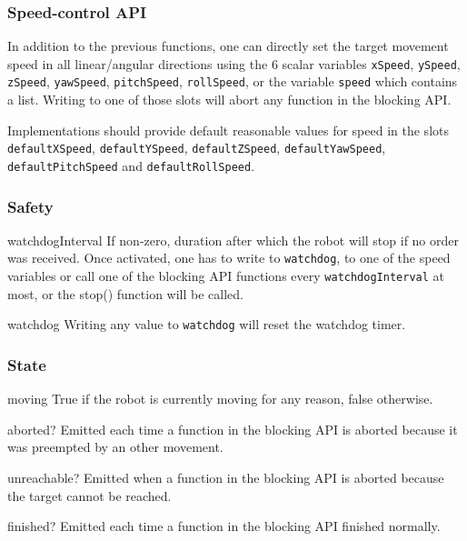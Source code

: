 \subsubsection{Speed-control API}

In addition to the previous functions, one can directly set the target
movement speed in all linear/angular directions using the 6 scalar variables
\lstinline{xSpeed}, \lstinline{ySpeed}, \lstinline{zSpeed},
\lstinline{yawSpeed}, \lstinline{pitchSpeed}, \lstinline{rollSpeed}, or the
variable \lstinline{speed} which contains a list.  Writing to one of those
slots will abort any function in the blocking API.

Implementations should provide default reasonable values for speed in the
slots \lstinline{defaultXSpeed}, \lstinline{defaultYSpeed},
\lstinline{defaultZSpeed}, \lstinline{defaultYawSpeed},
\lstinline{defaultPitchSpeed} and \lstinline{defaultRollSpeed}.

\subsubsection{Safety}

\begin{urbiscriptapi}

\item{watchdogInterval} If non-zero, duration after which the robot will
  stop if no order was received. Once activated, one has to write to
  \lstinline|watchdog|, to one of the speed variables or call one of the
  blocking API functions every \lstinline|watchdogInterval| at most, or the
  stop() function will be called.
\item{watchdog} Writing any value to \lstinline|watchdog| will reset the
  watchdog timer.

\end{urbiscriptapi}

\subsubsection{State}

\begin{urbiscriptapi}
\item[moving] True if the robot is currently moving for any reason, false
  otherwise.
\item[aborted?] Emitted each time a function in the blocking API is aborted
  because it was preempted by an other movement.
\item[unreachable?] Emitted when a function in the blocking API is aborted
  because the target cannot be reached.
\item[finished?] Emitted each time a function in the blocking API finished
  normally.

\end{urbiscriptapi}

